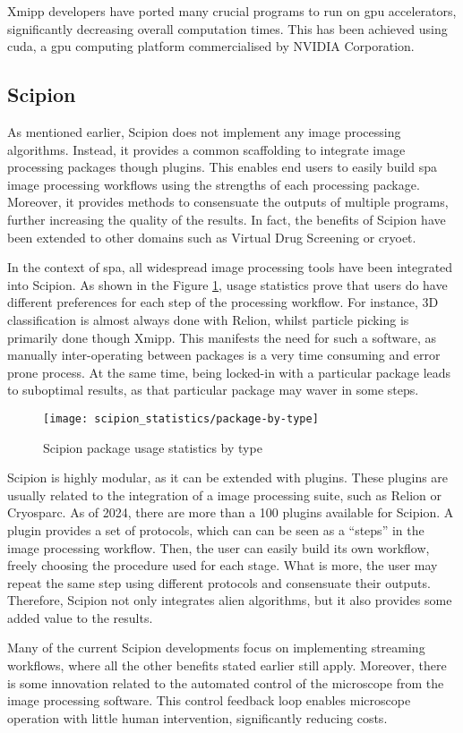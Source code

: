 \documentclass[../main.tex]{subfiles}
\begin{document}
Xmipp developers have ported many crucial programs to run on \gls{gpu} accelerators, significantly decreasing overall computation times. This has been achieved using \gls{cuda}, a \gls{gpu} computing platform commercialised by NVIDIA Corporation.

\subsection{Scipion}
As mentioned earlier, Scipion does not implement any image processing algorithms. Instead, it provides a common scaffolding to integrate image processing packages though plugins. This enables end users to easily build \gls{spa} image processing workflows using the strengths of each processing package. Moreover, it provides methods to consensuate the outputs of multiple programs, further increasing the quality of the results. In fact, the benefits of Scipion have been extended to other domains such as Virtual Drug Screening\cite{scipion_chem} or \gls{cryoet}\cite{jimenezdelamorena2021}.

In the context of \gls{spa}, all widespread image processing tools have been integrated into Scipion. As shown in the Figure \ref{fig:3:scipion_statistics_type}, usage statistics prove that users do have different preferences for each step of the processing workflow. For instance, 3D classification is almost always done with Relion, whilst particle picking is primarily done though Xmipp. This manifests the need for such a software, as manually inter-operating between packages is a very time consuming and error prone process. At the same time, being locked-in with a particular package leads to suboptimal results, as that particular package may waver in some steps.

\begin{figure}[htbp]
    \centering
    \texttt{[image: scipion\_statistics/package-by-type]}
    \caption{Scipion package usage statistics by type}
    \label{fig:3:scipion_statistics_type}
\end{figure}

Scipion is highly modular, as it can be extended with plugins. These plugins are usually related to the integration of a image processing suite, such as Relion or Cryosparc. As of 2024, there are more than a 100 plugins available for Scipion. A plugin provides a set of protocols, which can can be seen as a ``steps'' in the image processing workflow. Then, the user can easily build its own workflow, freely choosing the procedure used for each stage. What is more, the user may repeat the same step using different protocols and consensuate their outputs. Therefore, Scipion not only integrates alien algorithms, but it also provides some added value to the results.

Many of the current Scipion developments focus on implementing streaming workflows, where all the other benefits stated earlier still apply. Moreover, there is some innovation related to the automated control of the microscope from the image processing software. This control feedback loop enables microscope operation with little human intervention, significantly reducing costs.
\end{document}
